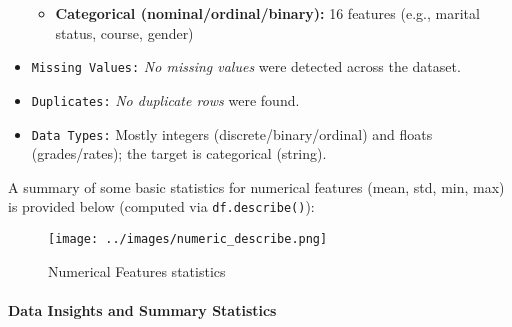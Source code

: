 \documentclass[twoside,final]{hcmut-report}
\begin{document}
\begin{itemize}[parsep=0pt, itemsep=0pt, topsep=0pt]
\begin{itemize}
          \item \textbf{Categorical (nominal/ordinal/binary):} 16 features (e.g., marital status, course, gender)
        \end{itemize}
  \item \texttt{Missing Values:} \textit{No missing values} were detected across the dataset.
  \item \texttt{Duplicates:} \textit{No duplicate rows} were found.
  \item \texttt{Data Types:} Mostly integers (discrete/binary/ordinal) and floats (grades/rates); the target is categorical (string).
\end{itemize}

A summary of some basic statistics for numerical features (mean, std, min, max) is provided below (computed via \texttt{df.describe()}):

\begin{figure}[H]
  \centering
  \texttt{[image: ../images/numeric\_describe.png]}
  \caption{Numerical Features statistics}
  \label{num-describe}
\end{figure}


\paragraph{Data Insights and Summary Statistics}
\end{document}
